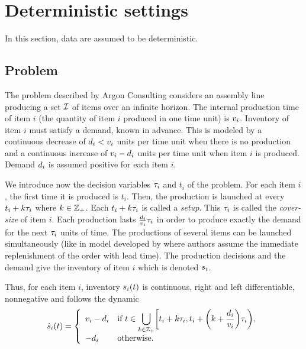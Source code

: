 \section{Deterministic settings}
\label{sec:lot-size:single-line:deterministic}

In this section, data are assumed to be deterministic.


\subsection{Problem}
\label{sec:lot-size:single-line:deterministic:problems}

The problem described by Argon Consulting considers an assembly line producing a set $\mathcal{I}$ of items over an infinite horizon.
The internal production time of item $i$ (\ie the quantity of item $i$ produced in one time unit) is $v_i$.
Inventory of item $i$ must satisfy a demand, known in advance.
This is modeled by a continuous decrease of $d_i<v_i$ units per time unit when there is no production and a continuous increase of $v_i-d_i$ units per time unit when item $i$ is produced.
Demand $d_i$ is assumed positive for each item $i$.


We introduce now the decision variables $\tau_i$ and $t_i$ of the problem.
For each item $i$, the first time it is produced is $t_i$.
Then, the production is launched at every $t_i+k\tau_i$ where $k\in\mathbb{Z}_+$.
Each $t_i+k\tau_i$ is called a \emph{setup}.
This $\tau_i$ is called the \emph{cover-size} of item $i$.
Each production lasts $\frac{d_i}{v_i}\tau_i$ in order to produce exactly the demand for the next $\tau_i$ units of time.
The productions of several items can be launched simultaneously (like in model developed by \citet{Ohno2001} where authors assume the immediate replenishment of the order with lead time).
The production decisions and the demand give the inventory of item $i$ which is denoted $s_i$.


Thus, for each item $i$, inventory $\inventory_i\bracket{t}$ is continuous, right and left differentiable, nonnegative and follows the dynamic
\begin{equation}\label{eq:lot-size:single-line:deterministic:motivations:dynamic}
  \dot{\inventory}_i\bracket{t} =
  \left\{
  \begin{array}{ll}
  \rate_i-\demand_i
  & \ds\mbox{if}\ t\in\bigcup_{k\in\ZZ_+} \left[t_i+k\cover_i,t_i+\bracket{k+\frac{\demand_i}{\rate_i}}\cover_i\right),
  \\
  -\demand_i
  & \mbox{otherwise}.
  \end{array}
  \right.
\end{equation}


